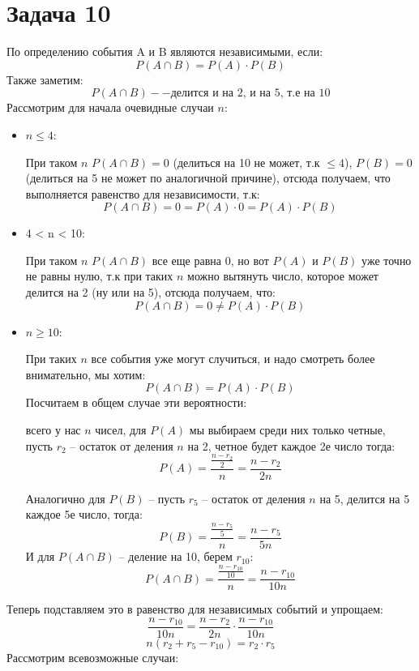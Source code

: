 \documentclass[a4paper,12pt]{article}
\begin{document}
\section*{Задача 10 }
По определению события A и B являются независимыми, если:
\[
P(A \cap B) = P(A) \cdot P(B)
\]
Также заметим:
\[
P(A \cap B) -- \text{делится и на 2, и на 5, т.е на 10}
\]
Рассмотрим для начала очевидные случаи $n$:
\begin{itemize}
\item $n \leq 4$:

При таком $n$ $P(A \cap B) = 0$ (делиться на 10 не может, т.к $\leq 4$), $P(B) = 0$ (делиться на 5 не может по аналогичной причине), отсюда получаем, что выполняется равенство для независимости, т.к:
\[
P(A \cap B) = 0 = P(A) \cdot 0 = P(A) \cdot P(B)
\]
\item 4 < n < 10:

При таком $n$ $P(A \cap B)$ все еще равна 0, но вот $P(A)$ и $P(B)$ уже точно не равны нулю, т.к при таких $n$ можно вытянуть число, которое может делится на 2 (ну или на 5), отсюда получаем, что:
\[
P(A \cap B) = 0 \neq P(A) \cdot P(B)
\]
\item $n \geq 10$:

При таких $n$ все события уже могут случиться, и надо смотреть более внимательно, мы хотим:
\[
P(A \cap B) = P(A) \cdot P(B)
\]
Посчитаем в общем случае эти вероятности:

всего у нас $n$ чисел, для $P(A)$ мы выбираем среди них только четные, пусть $r_2$ -- остаток от деления $n$ на 2, четное будет каждое 2е число тогда:
\[
P(A) = \frac{\frac{n - r_2}{2}}{n} = \frac{n - r_2}{2n}
\]

Аналогично для $P(B)$ -- пусть $r_5$ -- остаток от деления $n$ на 5, делится на 5 каждое 5е число, тогда:
\[
P(B) = \frac{\frac{n - r_5}{5}}{n} = \frac{n - r_5}{5n}
\]
И для $P(A \cap B)$ -- деление на 10, берем $r_{10}$:
\[
P(A \cap B) = \frac{\frac{n - r_{10}}{10}}{n} = \frac{n - r_{10}}{10n}
\]
\end{itemize}
Теперь подставляем это в равенство для независимых событий и упрощаем:
\[
\frac{n - r_{10}}{10n} = \frac{n - r_2}{2n} \cdot \frac{n - r_{10}}{10n}
\]
\[
n(r_2 + r_5 - r_{10}) = r_2 \cdot r_5
\]
Рассмотрим всевозможные случаи:
\end{document}
